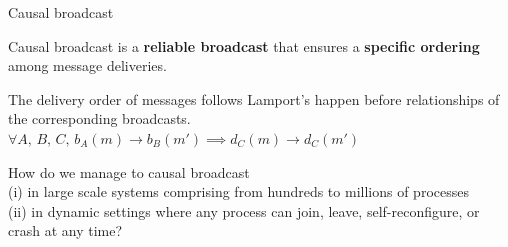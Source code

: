 \documentclass[10pt, xcolor={usenames, dvipsnames}]{beamer}
\begin{document}
\begin{frame}{Causal broadcast}

  Causal broadcast is a \textbf{reliable broadcast} that ensures a
  \textbf{specific ordering} among message deliveries.
  

  \vspace{1em}

  \begin{definition}
    The delivery order of messages follows Lamport's happen before relationships of the
    corresponding broadcasts. $\forall A,\,B,\,C,\,
    b_A(m) \rightarrow b_B(m') \implies d_C(m) \rightarrow d_C(m')$
  \end{definition}

  
  \begin{minipage}{0.49\textwidth}
    \begin{center}
    
    \end{center}
  \end{minipage}
  \begin{minipage}{0.49\textwidth}
    \begin{center}
    
    \end{center}
  \end{minipage}


\end{frame}


\begin{frame}[standout]
  How do we manage to causal broadcast\\
  (i) in large scale systems comprising
  from hundreds to millions of processes\\
  (ii) in dynamic settings where any process can join, leave,
  self-reconfigure, or crash at any time?

  \vspace{2em}
  
  

\end{frame}
\end{document}
